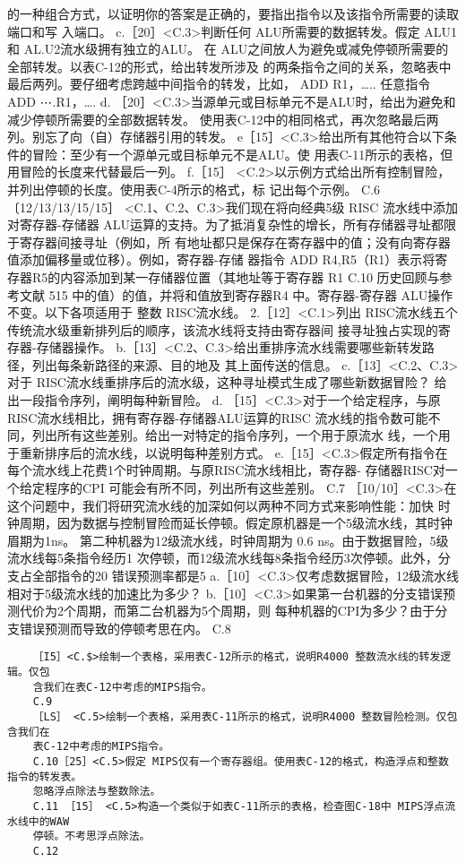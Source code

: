 的一种组合方式，以证明你的答案是正确的，要指出指令以及该指令所需要的读取端口和写
入端口。
c.［20］<C.3>判断任何 ALU所需要的数据转发。假定 ALU1和 AL.U2流水级拥有独立的ALU。
在 ALU之间放人为避免或减免停顿所需要的全部转发。以表C-12的形式，给出转发所涉及
的两条指令之间的关系，忽略表中最后两列。要仔细考虑跨越中间指令的转发，比如，
ADD
R1，…..
任意指令
ADD
⋯.R1，….
d. ［20］<C.3>当源单元或目标单元不是ALU时，给出为避免和减少停顿所需要的全部数据转发。
使用表C-12中的相同格式，再次忽略最后两列。别忘了向（自）存储器引用的转发。
e［15］<C.3>给出所有其他符合以下条件的冒险：至少有一个源单元或目标单元不是ALU。使
用表C-11所示的表格，但用冒险的长度来代替最后一列。
f.［15］ <C.2>以示例方式给出所有控制冒险，并列出停顿的长度。使用表C-4所示的格式，标
记出每个示例。
C.6 〔12/13/13/15/15］ <C.1、C.2、C.3>我们现在将向经典5级 RISC 流水线中添加对寄存器-存储器
ALU运算的支持。为了抵消复杂性的增长，所有存储器寻址都限于寄存器间接寻址（例如，所
有地址都只是保存在寄存器中的值；没有向寄存器值添加偏移量或位移）。例如，寄存器-存储
器指令 ADD R4,R5（R1）表示将寄存器R5的内容添加到某一存储器位置（其地址等于寄存器 R1
C.10
历史回顾与参考文献
515
中的值）的值，并将和值放到寄存器R4 中。寄存器-寄存器 ALU操作不变。以下各项适用于
整数 RISC流水线。
2.［12］<C.1>列出 RISC流水线五个传统流水级重新排列后的顺序，该流水线将支持由寄存器间
接寻址独占实现的寄存器-存储器操作。
b.［13］<C.2、C.3>给出重排序流水线需要哪些新转发路径，列出每条新路径的来源、目的地及
其上面传送的信息。
c.［13］<C.2、C.3>对于 RISC流水线重排序后的流水级，这种寻址模式生成了哪些新数据冒险？
给出一段指令序列，阐明每种新冒险。
d. ［15］<C.3>对于一个给定程序，与原 RISC流水线相比，拥有寄存器-存储器ALU运算的RISC
流水线的指令数可能不同，列出所有这些差别。给出一对特定的指令序列，一个用于原流水
线，一个用于重新排序后的流水线，以说明每种差别方式。
e.［15］<C.3>假定所有指令在每个流水线上花费1个时钟周期。与原RISC流水线相比，寄存器-
存储器RISC对一个给定程序的CPI 可能会有所不同，列出所有这些差别。
C.7
［10/10］<C.3>在这个问题中，我们将研究流水线的加深如何以两种不同方式来影响性能：加快
时钟周期，因为数据与控制冒险而延长停顿。假定原机器是一个5级流水线，其时钟眉期为1ns。
第二种机器为12级流水线，时钟周期为 0.6 ns。由于数据冒险，5级流水线每5条指令经历1
次停顿，而12级流水线每8条指令经历3次停顿。此外，分支占全部指令的20%
错误预测率都是5%
a.［10］<C.3>仅考虑数据冒险，12级流水线相对于5级流水线的加速比为多少？
b.［10］<C.3>如果第一台机器的分支错误预测代价为2个周期，而第二台机器为5个周期，则
每种机器的CPI为多少？由于分支错误预测而导致的停顿考思在内。
C.8
\begin{verbatim}
    ［I5］<C.$>绘制一个表格，采用表C-12所示的格式，说明R4000 整数流水线的转发逻辑。仅包
    含我们在表C-12中考虑的MIPS指令。
    C.9
    ［LS］ <C.5>绘制一个表格，采用表C-11所示的格式，说明R4000 整数冒险检测。仅包含我们在
    表C-12中考虑的MIPS指令。
    C.10［25］<C.5>假定 MIPS仅有一个寄存器组。使用表C-12的格式，构造浮点和整数指令的转发表。
    忽略浮点除法与整数除法。
    C.11 ［15］ <C.5>构造一个类似于如表C-11所示的表格，检查图C-18中 MIPS浮点流水线中的WAW
    停顿。不考思浮点除法。
    C.12
\end{verbatim}
